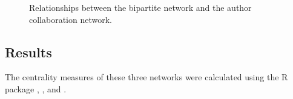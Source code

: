\begin{figure}[h]
{%
}%
%
\caption{Relationships between the bipartite network and the author collaboration network.}


\label{fig:net_illu}
\end{figure}




\subsection{Results}

The centrality measures of these three networks were calculated using the R package   \citep{csardi2006igraph},   \citep{salavaty2020integrated}, and  \citep{birankr}.


